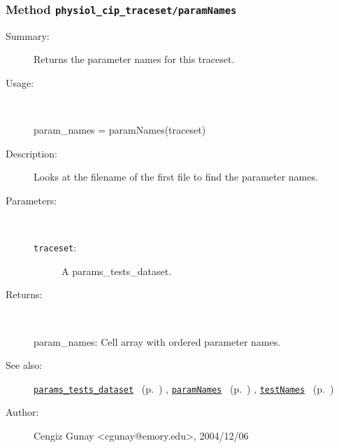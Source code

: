 \subsubsection[Method \texttt{paramNames}]{Method \texttt{physiol\_cip\_traceset/paramNames}}%
%
\label{ref_physiol_cip_traceset__paramNames}%
\hypertarget{ref_physiol_cip_traceset__paramNames}{}%
\begin{description}
\item[Summary:]Returns the parameter names for this traceset.
%
\item[Usage:]~%
\begin{lyxcode}%
param\_names = paramNames(traceset)
%
\end{lyxcode}%
%
\item[Description:]%
Looks at the filename of the first file to find the parameter names.
\item[Parameters:]~
\begin{description}%
\item[\texttt{traceset}:]
 A params\_tests\_dataset.
\end{description}%
%
\item[Returns:]~

	param\_names: Cell array with ordered parameter names.
%
%
\item[See also:]%
\hyperlink{ref_params_tests_dataset}{\texttt{params\_tests\_dataset}}%
\ (p.~\pageref{ref_params_tests_dataset})%
%
, \hyperlink{ref_paramNames}{\texttt{paramNames}}%
\ (p.~\pageref{ref_paramNames})%
%
, \hyperlink{ref_testNames}{\texttt{testNames}}%
\ (p.~\pageref{ref_testNames})%
%
%
\item[Author:]%
Cengiz Gunay <cgunay@emory.edu>, 2004/12/06%
\end{description}
\methodline%
